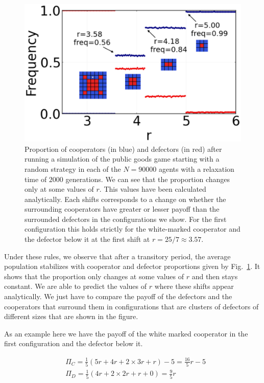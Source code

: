 \begin{figure}
	\centering
	\includegraphics[width=1\linewidth]{Images/P3/PGG_Proportion.eps}
	\caption{Proportion of cooperators (in blue) and defectors (in red) after running a simulation of the public goods game starting with a random strategy in each of the $N=90000$ agents with a relaxation time of $2000$ generations. We can see that the proportion changes only at some values of $r$. This values have been calculated analytically. Each shifts corresponds to a change on whether the surrounding cooperators have greater or lesser payoff than the surrounded defectors in the configurations we show. For the first configuration this holds strictly for the white-marked cooperator and the defector below it at the first shift at $r=25/7\approx3.57$.}
	\label{fig:PGG_Proportion}
\end{figure}


Under these rules, we observe that after a transitory period, the average population stabilizes with  cooperator and defector proportions given by Fig.~\ref{fig:PGG_Proportion}. It shows that the proportion only changes at some values of $r$ and then stays constant. We are able to predict the values of $r$ where these shifts appear analytically. We just have to compare the payoff of the defectors and the cooperators that surround them in configurations that are clusters of defectors of different sizes that are shown in the figure.

As an example here we have the payoff of the white marked cooperator in the first configuration and the defector below it.

\begin{equation}
    \begin{split}
    	&\Pi_C=\frac{1}{5}(5r+4r+2\times3r+r)-5=\frac{16}{5}r-5 \\
    	&\Pi_D=\frac{1}{5}(4r+2\times2r+r+0)=\frac{9}{5}r
    \end{split}
\end{equation}

